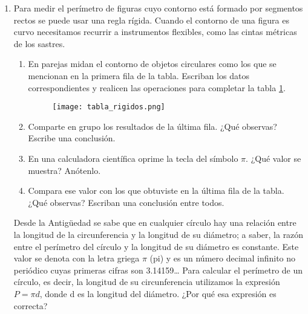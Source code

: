 \begin{enumerate}
    \item Para medir el perímetro de figuras cuyo contorno está formado por segmentos
          rectos se puede usar una regla rígida. Cuando el contorno de una figura es
          curvo necesitamos recurrir a instrumentos flexibles, como las cintas métricas
          de los sastres.
          \begin{enumerate}
              \item En parejas midan el contorno de objetos circulares como los que se mencionan en
                    la primera fila de la tabla. Escriban los datos correspondientes y realicen las
                    operaciones para completar la tabla \ref{tab:tabla_rigidos}.\\

                    \begin{figure}[H]
                        \centering
                        \texttt{[image: tabla\_rigidos.png]}
                        \label{tab:tabla_rigidos}
                    \end{figure}

              \item Comparte en grupo los resultados de la última fila. ¿Qu\'e observas? Escribe una conclusión.
              \item En una calculadora científica oprime la tecla del símbolo $\pi$. ¿Qué valor se muestra? Anótenlo.
              \item Compara ese valor con los que obtuviste en la última fila de la tabla. ¿Qué observas?
                    Escriban una conclusión entre todos.
          \end{enumerate}

          \begin{boxH}
              Desde la Antigüedad se sabe que en cualquier círculo hay una relación entre la longitud de la
              circunferencia y la longitud de su diámetro; a saber, la razón entre el perímetro del círculo y
              la longitud de su diámetro es constante.
              Este valor se denota con la letra griega $\pi$ (pi) y es un número decimal infinito no periódico
              cuyas primeras cifras son 3.14159\dots
              Para calcular el perímetro de un círculo, es decir, la longitud de su circunferencia utilizamos
              la expresión $P =\pi d$, donde d es la longitud del diámetro. ¿Por qué esa expresión es correcta?
          \end{boxH}


\end{enumerate}
